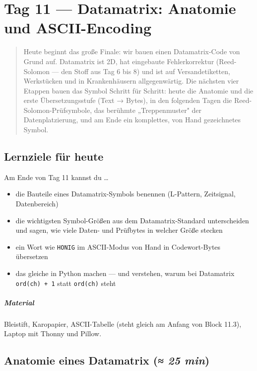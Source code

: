 \chapter{Tag 11 — Datamatrix: Anatomie und ASCII-Encoding}

\begin{quote}
Heute beginnt das große Finale: wir bauen einen Datamatrix-Code von
Grund auf. Datamatrix ist 2D, hat eingebaute Fehlerkorrektur (Reed-
Solomon — den Stoff aus Tag 6 bis 8) und ist auf Versandetiketten,
Werkstücken und in Krankenhäusern allgegenwärtig. Die nächsten vier
Etappen bauen das Symbol Schritt für Schritt: heute die Anatomie und
die erste Übersetzungsstufe (Text → Bytes), in den folgenden Tagen
die Reed-Solomon-Prüfsymbole, das berühmte „Treppenmuster" der
Datenplatzierung, und am Ende ein komplettes, von Hand gezeichnetes
Symbol.
\end{quote}

\section*{Lernziele für heute}

Am Ende von Tag 11 kannst du \dots

\begin{itemize}
\item die Bauteile eines Datamatrix-Symbols benennen (L-Pattern,
  Zeitsignal, Datenbereich)
\item die wichtigsten Symbol-Größen aus dem Datamatrix-Standard
  unterscheiden und sagen, wie viele Daten- und Prüfbytes in welcher
  Größe stecken
\item ein Wort wie \texttt{HONIG} im ASCII-Modus von Hand in
  Codewort-Bytes übersetzen
\item das gleiche in Python machen — und verstehen, warum bei
  Datamatrix \texttt{ord(ch) + 1} statt \texttt{ord(ch)} steht
\end{itemize}

\paragraph{Material} Bleistift, Karopapier, ASCII-Tabelle (steht
gleich am Anfang von Block 11.3), Laptop mit Thonny und Pillow.

\section{Anatomie eines Datamatrix \normalfont(\textit{≈ 25 min})}


